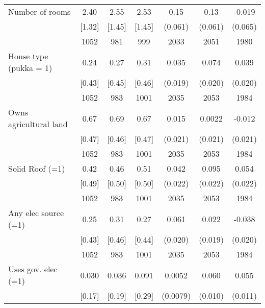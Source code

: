 \begin{table}[htbp]
\begin{tabular*}{1\hsize}{@{\hskip\tabcolsep\extracolsep\fill}l*{1}{cccccc}}
Number of rooms                 &     2.40&     2.55&     2.53&     0.15\sym{**} &     0.13\sym{**} &   -0.019         \\
                                &   [1.32]&   [1.45]&   [1.45]&  (0.061)         &  (0.061)         &  (0.065)         \\
                                &     1052&      981&      999&     2033         &     2051         &     1980         \\
House type (pukka = 1)          &     0.24&     0.27&     0.31&    0.035\sym{*}  &    0.074\sym{***}&    0.039\sym{*}  \\
                                &   [0.43]&   [0.45]&   [0.46]&  (0.019)         &  (0.020)         &  (0.020)         \\
                                &     1052&      983&     1001&     2035         &     2053         &     1984         \\
Owns agricultural land          &     0.67&     0.69&     0.67&    0.015         &   0.0022         &   -0.012         \\
                                &   [0.47]&   [0.46]&   [0.47]&  (0.021)         &  (0.021)         &  (0.021)         \\
                                &     1052&      983&     1001&     2035         &     2053         &     1984         \\
Solid Roof (=1)                 &     0.42&     0.46&     0.51&    0.042\sym{*}  &    0.095\sym{***}&    0.054\sym{**} \\
                                &   [0.49]&   [0.50]&   [0.50]&  (0.022)         &  (0.022)         &  (0.022)         \\
                                &     1052&      983&     1001&     2035         &     2053         &     1984         \\
Any elec source (=1)            &     0.25&     0.31&     0.27&    0.061\sym{***}&    0.022         &   -0.038\sym{*}  \\
                                &   [0.43]&   [0.46]&   [0.44]&  (0.020)         &  (0.019)         &  (0.020)         \\
                                &     1052&      983&     1001&     2035         &     2053         &     1984         \\
Uses gov. elec (=1)             &    0.030&    0.036&    0.091&   0.0052         &    0.060\sym{***}&    0.055\sym{***}\\
                                &   [0.17]&   [0.19]&   [0.29]& (0.0079)         &  (0.010)         &  (0.011)         \\

\end{tabular*}
\end{table}
